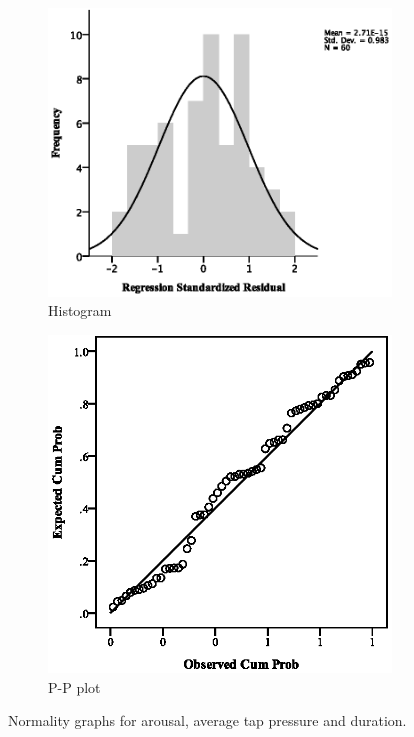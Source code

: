 \par\bigskip
\par\bigskip
\begin{figure}[ht]
\centering
\begin{subfigure}[b]{0.45\textwidth}
    \centering
    \includegraphics[width=\textwidth]{images/normality/ArMax/HistArMax.eps}
    \caption{Histogram}
    \label{fig:histarmax}
\end{subfigure}
\quad
\begin{subfigure}[b]{0.45\textwidth}
    \centering
    \includegraphics[width=\textwidth]{images/normality/ArMax/PPArMax.eps}
    \caption{P-P plot}
    \label{fig:pparmax}
\end{subfigure}
\caption{Normality graphs for arousal, average tap pressure and duration.}
\end{figure}
